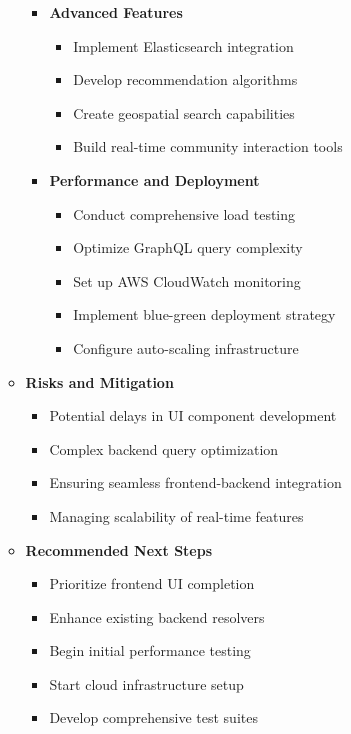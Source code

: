 \begin{itemize}
\begin{itemize}[label=-]
\begin{itemize}
            \item \textbf{Advanced Features}
            \begin{itemize}
                \item Implement Elasticsearch integration
                \item Develop recommendation algorithms
                \item Create geospatial search capabilities
                \item Build real-time community interaction tools
            \end{itemize}

            \item \textbf{Performance and Deployment}
            \begin{itemize}
                \item Conduct comprehensive load testing
                \item Optimize GraphQL query complexity
                \item Set up AWS CloudWatch monitoring
                \item Implement blue-green deployment strategy
                \item Configure auto-scaling infrastructure
            \end{itemize}
        \end{itemize}

        \item \textbf{Risks and Mitigation}
        \begin{itemize}
            \item Potential delays in UI component development
            \item Complex backend query optimization
            \item Ensuring seamless frontend-backend integration
            \item Managing scalability of real-time features
        \end{itemize}

        \item \textbf{Recommended Next Steps}
        \begin{itemize}
            \item Prioritize frontend UI completion
            \item Enhance existing backend resolvers
            \item Begin initial performance testing
            \item Start cloud infrastructure setup
            \item Develop comprehensive test suites
        \end{itemize}
    \end{itemize}
\end{itemize}